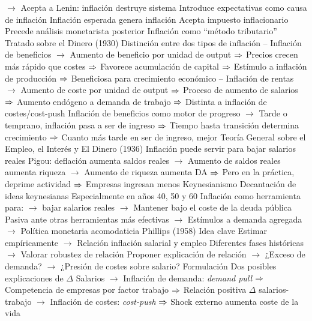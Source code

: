 \documentclass{nuevotema}
\begin{document}
\begin{esquemal}
				\4[] $\to$ Acepta a Lenin: inflación destruye sistema
				\4 Introduce expectativas como causa de inflación
				\4[] Inflación esperada genera inflación
				\4 Acepta impuesto inflacionario
				\4[] Precede análisis monetarista posterior
				\4[] Inflación como ``método tributario''
				\4 Tratado sobre el Dinero (1930)
				\4[] Distinción entre dos tipos de inflación
				\4[] -- Inflación de beneficios
				\4[] $\to$ Aumento de beneficio por unidad de output
				\4[] $\Rightarrow$ Precios crecen más rápido que costes
				\4[] $\Rightarrow$ Favorece acumulación de capital
				\4[] $\Rightarrow$ Estímulo a inflación de producción
				\4[] $\Rightarrow$ Beneficiosa para crecimiento económico
				\4[] -- Inflación de rentas
				\4[] $\to$ Aumento de coste por unidad de output
				\4[] $\Rightarrow$ Proceso de aumento de salarios
				\4[] $\Rightarrow$ Aumento endógeno a demanda de trabajo
				\4[] $\Rightarrow$ Distinta a inflación de costes/cost-push
				\4[] Inflación de beneficios como motor de progreso
				\4[] $\to$ Tarde o temprano, inflación pasa a ser de ingreso
				\4[] $\Rightarrow$ Tiempo hasta transición determina crecimiento
				\4[] $\Rightarrow$ Cuanto más tarde en ser de ingreso, mejor
				\4 Teoría General sobre el Empleo, el Interés y El Dinero (1936)
				\4[] Inflación puede servir para bajar salarios reales
				\4[] Pigou: deflación aumenta saldos reales
				\4[] $\to$ Aumento de saldos reales aumenta riqueza
				\4[] $\to$ Aumento de riqueza aumenta DA
				\4[] $\Rightarrow$ Pero en la práctica, deprime actividad
				\4[] $\Rightarrow$ Empresas ingresan menos
				\4 Keynesianismo
				\4[] Decantación de ideas keynesianas
				\4[] Especialmente en años 40, 50 y 60
				\4[] Inflación como herramienta para:
				\4[] $\to$ bajar salarios reales
				\4[] $\to$ Mantener bajo el coste de la deuda pública
				\4[] Pasiva ante otras herramientas más efectivas
				\4[] $\to$ Estímulos a demanda agregada
				\4[] $\to$ Política monetaria acomodaticia
			\3 Phillips (1958)
				\4 Idea clave
				\4[] Estimar empíricamente
				\4[] $\to$ Relación inflación salarial y empleo
				\4[] Diferentes fases históricas
				\4[] $\to$ Valorar robustez de relación
				\4[] Proponer explicación de relación
				\4[] $\to$ ¿Exceso de demanda?
				\4[] $\to$ ¿Presión de costes sobre salario?
				\4 Formulación
				\4[] Dos posibles explicaciones de $\Delta$ Salarios
				\4[] $\to$ Inflación de demanda: \textit{demand pull}
				\4[] $\Rightarrow$ Competencia de empresas por factor trabajo
				\4[] $\Rightarrow$ Relación positiva $\Delta$ salarios-trabajo
				\4[] $\to$ Inflación de costes: \textit{cost-push}
				\4[] $\Rightarrow$ Shock externo aumenta coste de la vida

\end{esquemal}
\end{document}

